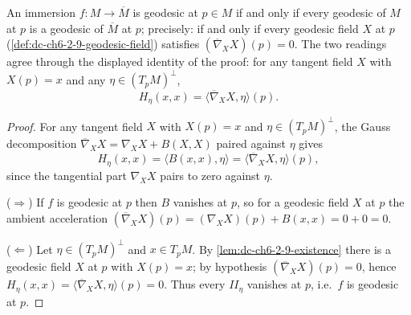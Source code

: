 \begin{proposition}
  \label{prop:dc-ch6-2-9}
  \leanok
  An immersion $f:M\to\overline{M}$ is geodesic at $p\in M$ if and only if every
  geodesic of $M$ at $p$ is a geodesic of $\overline{M}$ at $p$; precisely: if
  and only if every geodesic field $X$ at $p$
  (\cref{def:dc-ch6-2-9-geodesic-field}) satisfies
  $(\overline{\nabla}_X X)(p)=0$. The two readings agree through the displayed
  identity of the proof: for any tangent field $X$ with $X(p)=x$ and any
  $\eta\in(T_pM)^\perp$,
  $$
  H_\eta(x,x)=\langle\overline{\nabla}_X X,\eta\rangle(p).
  $$
\end{proposition}
\begin{proof}
  \leanok
  \sketch
  For any tangent field $X$ with $X(p)=x$ and $\eta\in(T_pM)^\perp$, the Gauss
  decomposition $\overline{\nabla}_X X=\nabla_X X+B(X,X)$ paired against $\eta$
  gives
  $$
  H_\eta(x,x)=\langle B(x,x),\eta\rangle=\langle\overline{\nabla}_X X,\eta\rangle(p),
  $$
  since the tangential part $\nabla_X X$ pairs to zero against $\eta$.

  ($\Rightarrow$) If $f$ is geodesic at $p$ then $B$ vanishes at $p$, so for a
  geodesic field $X$ at $p$ the ambient acceleration
  $(\overline{\nabla}_X X)(p)=(\nabla_X X)(p)+B(x,x)=0+0=0$.

  ($\Leftarrow$) Let $\eta\in(T_pM)^\perp$ and $x\in T_pM$. By
  \cref{lem:dc-ch6-2-9-existence} there is a geodesic field $X$ at $p$ with
  $X(p)=x$; by hypothesis $(\overline{\nabla}_X X)(p)=0$, hence
  $H_\eta(x,x)=\langle\overline{\nabla}_X X,\eta\rangle(p)=0$. Thus every
  $\mathit{II}_\eta$ vanishes at $p$, i.e.\ $f$ is geodesic at $p$.
\end{proof}

